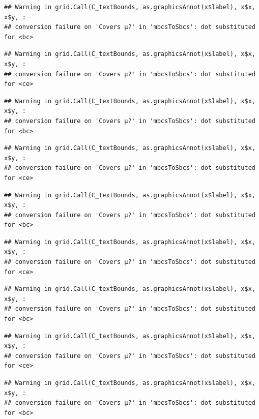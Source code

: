 \documentclass[]{book}
\theoremstyle{definition}
\theoremstyle{definition}
\theoremstyle{definition}
\theoremstyle{remark}
\begin{document}
\begin{verbatim}
## Warning in grid.Call(C_textBounds, as.graphicsAnnot(x$label), x$x, x$y, :
## conversion failure on 'Covers μ?' in 'mbcsToSbcs': dot substituted for <bc>
\end{verbatim}

\begin{verbatim}
## Warning in grid.Call(C_textBounds, as.graphicsAnnot(x$label), x$x, x$y, :
## conversion failure on 'Covers μ?' in 'mbcsToSbcs': dot substituted for <ce>
\end{verbatim}

\begin{verbatim}
## Warning in grid.Call(C_textBounds, as.graphicsAnnot(x$label), x$x, x$y, :
## conversion failure on 'Covers μ?' in 'mbcsToSbcs': dot substituted for <bc>
\end{verbatim}

\begin{verbatim}
## Warning in grid.Call(C_textBounds, as.graphicsAnnot(x$label), x$x, x$y, :
## conversion failure on 'Covers μ?' in 'mbcsToSbcs': dot substituted for <ce>
\end{verbatim}

\begin{verbatim}
## Warning in grid.Call(C_textBounds, as.graphicsAnnot(x$label), x$x, x$y, :
## conversion failure on 'Covers μ?' in 'mbcsToSbcs': dot substituted for <bc>
\end{verbatim}

\begin{verbatim}
## Warning in grid.Call(C_textBounds, as.graphicsAnnot(x$label), x$x, x$y, :
## conversion failure on 'Covers μ?' in 'mbcsToSbcs': dot substituted for <ce>
\end{verbatim}

\begin{verbatim}
## Warning in grid.Call(C_textBounds, as.graphicsAnnot(x$label), x$x, x$y, :
## conversion failure on 'Covers μ?' in 'mbcsToSbcs': dot substituted for <bc>
\end{verbatim}

\begin{verbatim}
## Warning in grid.Call(C_textBounds, as.graphicsAnnot(x$label), x$x, x$y, :
## conversion failure on 'Covers μ?' in 'mbcsToSbcs': dot substituted for <ce>
\end{verbatim}

\begin{verbatim}
## Warning in grid.Call(C_textBounds, as.graphicsAnnot(x$label), x$x, x$y, :
## conversion failure on 'Covers μ?' in 'mbcsToSbcs': dot substituted for <bc>
\end{verbatim}
\end{document}
